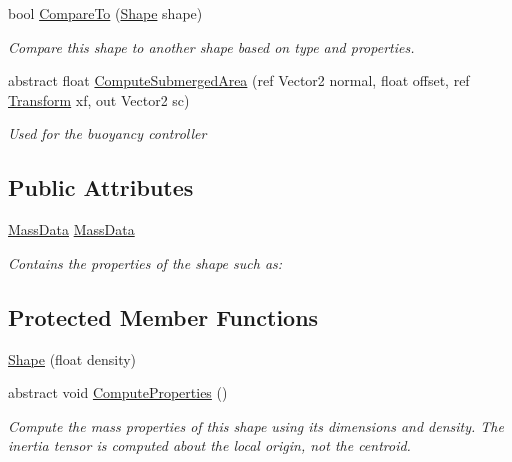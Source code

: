 \begin{DoxyCompactItemize}
bool \hyperlink{class_farseer_physics_1_1_collision_1_1_shapes_1_1_shape_ae7231174210edb0109f6e052d3882620}{Compare\+To} (\hyperlink{class_farseer_physics_1_1_collision_1_1_shapes_1_1_shape}{Shape} shape)
\begin{DoxyCompactList}\small\item\em Compare this shape to another shape based on type and properties. \end{DoxyCompactList}\item 
abstract float \hyperlink{class_farseer_physics_1_1_collision_1_1_shapes_1_1_shape_a8042406b3145e2535247e81536ed4e3e}{Compute\+Submerged\+Area} (ref Vector2 normal, float offset, ref \hyperlink{struct_farseer_physics_1_1_common_1_1_transform}{Transform} xf, out Vector2 sc)
\begin{DoxyCompactList}\small\item\em Used for the buoyancy controller \end{DoxyCompactList}\end{DoxyCompactItemize}
\subsection*{Public Attributes}
\begin{DoxyCompactItemize}
\item 
\hyperlink{struct_farseer_physics_1_1_collision_1_1_shapes_1_1_mass_data}{Mass\+Data} \hyperlink{class_farseer_physics_1_1_collision_1_1_shapes_1_1_shape_a744a8bbfbf07d2333ed9db28435ca6e4}{Mass\+Data}
\begin{DoxyCompactList}\small\item\em Contains the properties of the shape such as\+: \end{DoxyCompactList}\end{DoxyCompactItemize}
\subsection*{Protected Member Functions}
\begin{DoxyCompactItemize}
\item 
\hyperlink{class_farseer_physics_1_1_collision_1_1_shapes_1_1_shape_ac5a9ff09493d2a11ad01173031ff25e8}{Shape} (float density)
\item 
abstract void \hyperlink{class_farseer_physics_1_1_collision_1_1_shapes_1_1_shape_a7f84cb12e8f22b497c37ec6202990fe9}{Compute\+Properties} ()
\begin{DoxyCompactList}\small\item\em Compute the mass properties of this shape using its dimensions and density. The inertia tensor is computed about the local origin, not the centroid. \end{DoxyCompactList}\end{DoxyCompactItemize}
